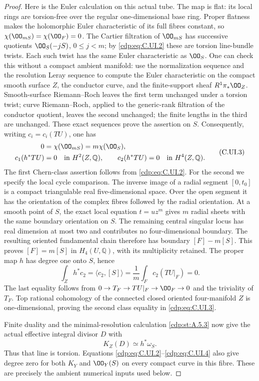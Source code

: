 \begin{proof}
Here is the Euler calculation on this actual tube.
The map is flat: its local rings are torsion-free
over the regular one-dimensional base ring.
Proper flatness makes the holomorphic Euler
characteristic of its full fibres constant, so
$\chi(\OO_{mS})=\chi(\OO_F)=0$.
The Cartier filtration of $\OO_{mS}$ has successive
quotients $\OO_S(-jS)$, $0\le j<m$; by \eqref{cdp:eq:C.UI.2}
these are torsion line-bundle twists.
Each such twist has the same Euler characteristic
as $\OO_S$. One can check this without a compact
ambient manifold: use the normalization sequence
and the resolution Leray sequence to compute the
Euler characteristic on the compact smooth surface
$Z$, the conductor curve, and the finite-support
sheaf $R^1\pi_*\OO_Z$. Smooth-surface
Riemann--Roch leaves the first term unchanged
under a torsion twist; curve Riemann--Roch,
applied to the generic-rank filtration of the
conductor quotient, leaves the second unchanged;
the finite lengths in the third are unchanged.
These exact sequences prove the assertion on $S$.
Consequently, writing $c_i=c_i(TU)$, one has
\[
 \begin{split}
 0&=\chi(\OO_{mS})=m\chi(\OO_S),\\
 c_1(h^*TU)&=0\quad\hbox{in }H^2(Z,\mathbb Q),
 \qquad c_2(h^*TU)=0\quad\hbox{in }H^4(Z,\mathbb Q).
 \end{split}
 \tag{C.UI.3}\label{cdp:eq:C.UI.3}
\]
The first Chern-class assertion follows from \eqref{cdp:eq:C.UI.2}.
For the second we specify the local cycle comparison.
The inverse image of a radial segment $[0,t_0]$
is a compact triangulable real five-dimensional
space. Over the open segment it has the orientation
of the complex fibres followed by the radial
orientation. At a smooth point of $S$, the exact
local equation $t=u z^m$ gives $m$ radial sheets
with the same boundary orientation on $S$.
The remaining central singular locus has real
dimension at most two and contributes no
four-dimensional boundary. The resulting oriented
fundamental chain therefore has boundary
$[F]-m[S]$. This proves $[F]=m[S]$ in
$H_4(U,\mathbb Q)$, with its multiplicity retained.
The proper map $h$ has degree one onto $S$, hence
\[
 \int_Z h^*c_2=\langle c_2,[S]\rangle
       =\frac1m\int_F c_2(TU|_F)=0.
\]
The last equality follows from
$0\to T_F\to TU|_F\to\OO_F\to0$ and the
triviality of $T_F$. Top rational cohomology of
the connected closed oriented four-manifold $Z$
is one-dimensional, proving the second class
equality in \eqref{cdp:eq:C.UI.3}.

Finite duality and the minimal-resolution calculation
\ref{cdp:st:A.5.3} now give the actual effective integral divisor $D$
with
\[
                    K_Z(D)\simeq h^*\omega_S.
 \tag{C.UI.4}\label{cdp:eq:C.UI.4}
\]
Thus that line is torsion. Equations \eqref{cdp:eq:C.UI.2}--\eqref{cdp:eq:C.UI.4}
also give degree zero for both $K_Y$ and $\OO_Y(S)$
on every compact curve in this fibre. These are precisely
the ambient numerical inputs used below.


\end{proof}
